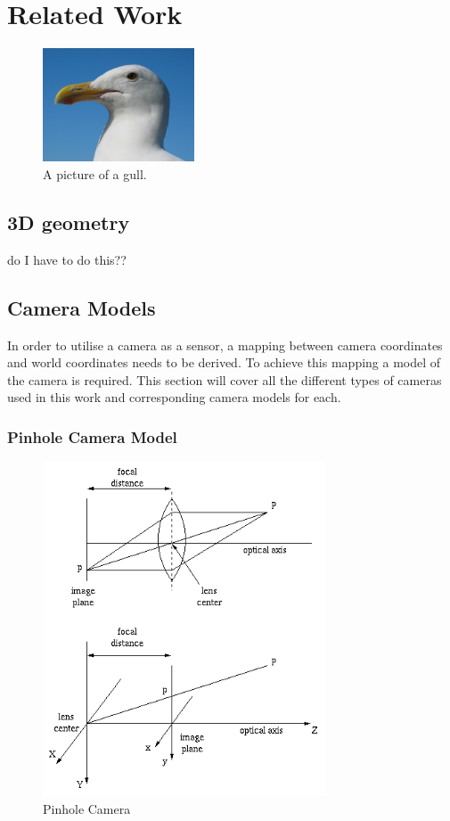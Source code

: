 \chapter{Related Work}
\label{chapter:Related_Work}

\begin{figure}[h!]
  \caption{A picture of a gull.}
  \centering
    \includegraphics[width=0.4\textwidth]{chapters/images/gull}
\end{figure}

\section{3D geometry}

do I have to do this??

\section{Camera Models}

In order to utilise a camera as a sensor, a mapping between camera coordinates and world coordinates
needs to be derived.  To achieve this mapping a model of the camera is required.  This section will
cover all the different types of cameras used in this work and corresponding camera models for
each. 

\subsection{Pinhole Camera Model}

\begin{figure}[h!]
  \caption{Pinhole Camera}
  \centering
    \includegraphics[width=0.75\textwidth]{chapters/images/pinhole_camera}
\end{figure}

